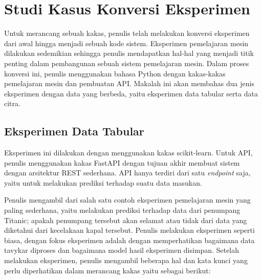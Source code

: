 \section{Studi Kasus Konversi Eksperimen}

Untuk merancang sebuah kakas, penulis telah melakukan konversi eksperimen dari awal hingga menjadi sebuah kode sistem.
Eksperimen pemelajaran mesin dilakukan sedemikian sehingga penulis mendapatkan hal-hal yang menjadi titik penting dalam pembangunan sebuah sistem pemelajaran mesin.
Dalam proses konversi ini, penulis menggunakan bahasa Python dengan kakas-kakas pemelajaran mesin dan pembuatan API\@.
Makalah ini akan membahas dua jenis eksperimen dengan data yang berbeda, yaitu eksperimen data tabular serta data citra.

\subsection{Eksperimen Data Tabular}
Eksperimen ini dilakukan dengan menggunakan kakas scikit-learn.
Untuk API, penulis menggunakan kakas FastAPI dengan tujuan akhir membuat sistem dengan arsitektur REST sederhana.
API hanya terdiri dari satu \textit{endpoint} saja, yaitu untuk melakukan prediksi terhadap suatu data masukan.

Penulis mengambil dari salah satu contoh eksperimen pemelajaran mesin yang paling sederhana, yaitu melakukan prediksi terhadap data dari penumpang Titanic; apakah penumpang tersebut akan selamat atau tidak dari data yang diketahui dari kecelakaan kapal tersebut.
Penulis melakukan eksperimen seperti biasa, dengan fokus eksperimen adalah dengan memperhatikan bagaimana data tavykar diproses dan bagaimana model hasil eksperimen disimpan.
Setelah melakukan eksperimen, penulis mengambil beberapa hal dan kata kunci yang perlu diperhatikan dalam merancang kakas yaitu sebagai berikut:

